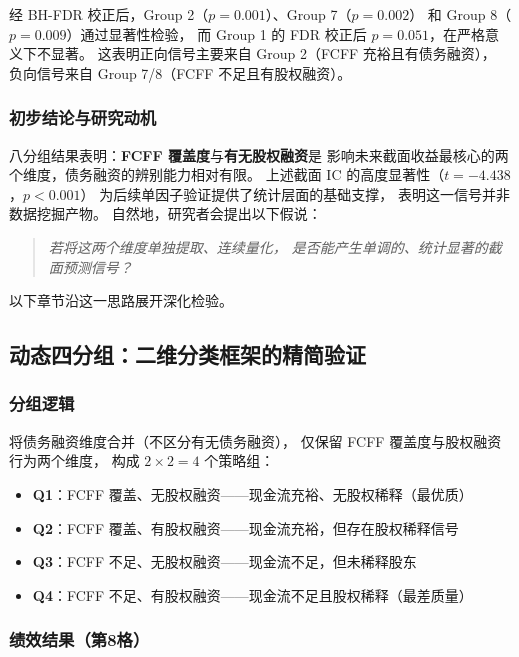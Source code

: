 \documentclass[a4paper,10pt]{article}
\begin{document}
经 BH-FDR 校正后，Group 2（$p=0.001$）、Group 7（$p=0.002$）
和 Group 8（$p=0.009$）通过显著性检验，
而 Group 1 的 FDR 校正后 $p=0.051$，在严格意义下不显著。
这表明正向信号主要来自 Group 2（FCFF 充裕且有债务融资），
负向信号来自 Group 7/8（FCFF 不足且有股权融资）。

\subsubsection{初步结论与研究动机}

八分组结果表明：\textbf{FCFF 覆盖度}与\textbf{有无股权融资}是
影响未来截面收益最核心的两个维度，债务融资的辨别能力相对有限。
上述截面 IC 的高度显著性（$t=-4.438$，$p<0.001$）
为后续单因子验证提供了统计层面的基础支撑，
表明这一信号并非数据挖掘产物。
自然地，研究者会提出以下假说：
\begin{quote}
    \textit{若将这两个维度单独提取、连续量化，
    是否能产生单调的、统计显著的截面预测信号？}
\end{quote}

以下章节沿这一思路展开深化检验。

\subsection{动态四分组：二维分类框架的精简验证}

\subsubsection{分组逻辑}

将债务融资维度合并（不区分有无债务融资），
仅保留 FCFF 覆盖度与股权融资行为两个维度，
构成 $2 \times 2 = 4$ 个策略组：

\begin{itemize}[leftmargin=2em]
    \item \textbf{Q1}：FCFF 覆盖、无股权融资——现金流充裕、无股权稀释（最优质）
    \item \textbf{Q2}：FCFF 覆盖、有股权融资——现金流充裕，但存在股权稀释信号
    \item \textbf{Q3}：FCFF 不足、无股权融资——现金流不足，但未稀释股东
    \item \textbf{Q4}：FCFF 不足、有股权融资——现金流不足且股权稀释（最差质量）
\end{itemize}

\subsubsection{绩效结果（第8格）}
\end{document}
